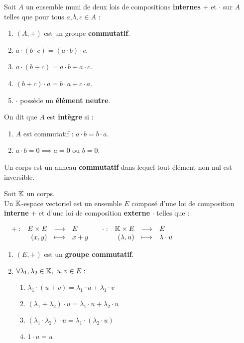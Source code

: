 \begin{definition}
	Soit $A$ un ensemble muni de deux lois de compositions \textbf{internes} \og $+$ \fg et \og $\cdot$ \fg sur $A$ telles que pour tous $a, b, c \in A$ : 
	\begin{enumerate}
			\item $(A, +)$ est un groupe \textbf{commutatif}.
			\item $a \cdot (b \cdot c) = (a \cdot b) \cdot c$.
			\item $a \cdot (b + c) = a \cdot b + a \cdot c$.
			\item $(b + c) \cdot a = b \cdot a + c \cdot a$.
			\item \og $\cdot$ \fg possède un \textbf{élément neutre}.
		\end{enumerate}
	\noindent On dit que $A$ est \textbf{intègre} si :
	\begin{enumerate}
			\item $A$ est commutatif : $a \cdot b = b \cdot a$.
			\item $a \cdot b = 0 \implies a = 0 \text{ ou } b = 0$.
		\end{enumerate}
\end{definition}

\begin{definition}
    Un corps est un anneau \textbf{commutatif} dans lequel tout élément non nul est inversible.
\end{definition}

\begin{definition}
	Soit $\mathbb{K}$ un corps. 
	\\
	Un $\mathbb{K}$-espace vectoriel est un ensemble $E$ composé d'une loi de composition \textbf{interne} \og $+$ \fg et d'une loi de composition \textbf{externe} \og $\cdot$ \fg telles que :
	\begin{center}
		$
		\begin{array}{cc}
			\begin{array}{rrcl} + : & E \times E & \longrightarrow & E \\ & (x,y) & \longmapsto & x+y \end{array}
			&
			\begin{array}{rrcl} \cdot : & \mathbb{K} \times E & \longrightarrow & E \\ & (\lambda, u) & \longmapsto & \lambda \cdot u \end{array}
		\end{array}
		$	
	\end{center}		
	
	\begin{enumerate}
		\item $(E, +)$ est un \textbf{groupe commutatif}.
		\item $\forall \lambda_1, \lambda_2 \in \K,\ u, v \in E :$
		\begin{enumerate}
			\item $\lambda_1 \cdot (u + v) = \lambda_1 \cdot u + \lambda_1 \cdot v$
			\item $(\lambda_1 + \lambda_2) \cdot u = \lambda_1 \cdot u + \lambda_2 \cdot u$
			\item $(\lambda_1 \cdot \lambda_2) \cdot u = \lambda_1 \cdot (\lambda_2 \cdot u)$
			\item $1 \cdot u = u$
		\end{enumerate}
	\end{enumerate}
\end{definition}

